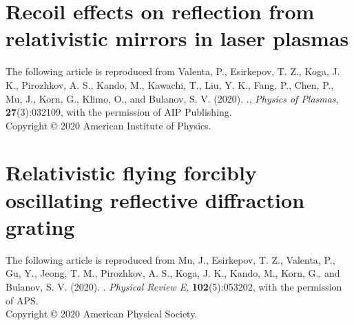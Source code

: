 \documentclass[10pt, a4paper, twoside, openright]{report}
\newcommand{\link}[3][blue]{\href{#2}{\color{#1}{#3}}}%
\begin{document}
\newpage
\mbox{}
\thispagestyle{empty}

\newpage


\mbox{}
\thispagestyle{empty}
\newpage

\section{Recoil effects on reflection from relativistic mirrors in laser plasmas\label{sec:paper_3}}

The following article is reproduced from Valenta, P., Esirkepov, T. Z., Koga, J. K., Pirozhkov, A. S., Kando, M., Kawachi, T., Liu, Y. K., Fang, P., Chen, P., Mu, J., Korn, G., Klimo, O., and Bulanov, S. V. (2020). \link{https://doi.org/10.1063/1.5142084}{Recoil effects on reflection from relativistic mirrors in laser plasmas}., \textit{Physics of Plasmas}, \textbf{27}(3):032109, with the permission of AIP Publishing. \\

\noindent Copyright {\copyright} {2020} {American Institute of Physics}.

\newpage
\mbox{}
\thispagestyle{empty}

\newpage


\section{Relativistic flying forcibly oscillating reflective diffraction grating\label{sec:paper_4}}

The following article is reproduced from Mu, J., Esirkepov, T. Z., Valenta, P., Gu, Y., Jeong, T. M., Pirozhkov, A. S., Koga, J. K., Kando, M., Korn, G., and Bulanov, S. V. (2020). \link{https://doi.org/10.1103/PhysRevE.102.053202}{Relativistic flying forcibly oscillating reflective diffraction grating}. \textit{Physical Review E}, \textbf{102}(5):053202, with the permission of APS. \\

\noindent Copyright {\copyright} {2020} {American Physical Society}.

\newpage
\mbox{}
\thispagestyle{empty}

\newpage


%

%
\end{document}
